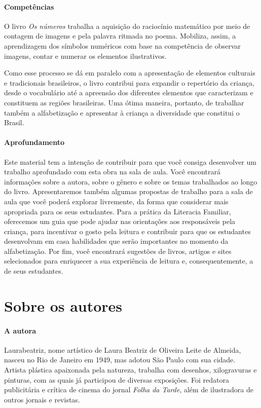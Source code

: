 \documentclass[11pt]{extarticle}
\begin{document}
\paragraph{Competências}
O livro \textit{Os números} trabalha a aquisição do raciocínio matemático por meio de contagem de imagens e pela palavra ritmada no poema. Mobiliza, assim, a aprendizagem dos símbolos numéricos com base na competência de observar imagens, contar e numerar os elementos ilustrativos.

Como esse processo se dá em paralelo com a apresentação de elementos culturais e tradicionais brasileiros, o livro contribui para expandir o repertório da criança, desde o vocabulário até a apreensão dos diferentes elementos que caracterizam e constituem as regiões brasileiras. Uma ótima maneira, portanto, de trabalhar também a alfabetização e apresentar à criança a diversidade que constitui o Brasil.


\paragraph{Aprofundamento} Este material tem a 
intenção de contribuir para que você consiga desenvolver um trabalho aprofundado 
com esta obra na sala de aula. Você encontrará informações sobre a autora, sobre 
o gênero e sobre os temas trabalhados ao longo do livro. Apresentaremos também 
algumas propostas de trabalho para a sala de aula que você poderá explorar livremente, 
da forma que considerar mais apropriada para os seus estudantes. Para a prática 
da Literacia Familiar, oferecemos um guia que pode ajudar nas orientações aos 
responsáveis pela criança, para incentivar o gosto pela leitura e contribuir para 
que os estudantes desenvolvam em casa habilidades que serão importantes no momento 
da alfabetização. Por fim, você encontrará sugestões de livros, artigos e sites 
selecionados para enriquecer a sua experiência de leitura e, 
consequentemente, a de seus estudantes.



\section{Sobre os autores}

\paragraph{A autora} Laurabeatriz, nome artístico de Laura Beatriz de Oliveira Leite de Almeida, nasceu no Rio de Janeiro em 1949, mas adotou São Paulo com sua cidade. Artista plástica apaixonada pela natureza, trabalha com desenhos, xilogravuras e pinturas, com as quais já participou de diversas exposições. Foi redatora publicitária e crítica de cinema do jornal \textit{Folha da Tarde}, além de ilustradora de outros jornais e revistas.
\end{document}
